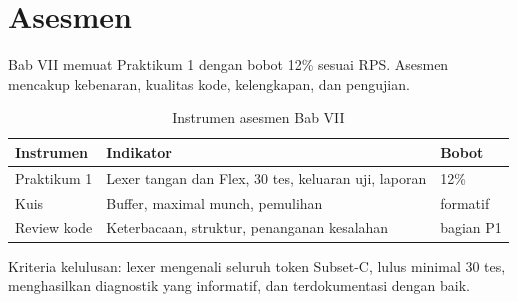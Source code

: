 \section*{Asesmen}

Bab VII memuat Praktikum 1 dengan bobot 12\% sesuai RPS. Asesmen
mencakup kebenaran, kualitas kode, kelengkapan, dan pengujian.

\begin{table}[H]
\centering
\caption{Instrumen asesmen Bab VII}
\label{tab:ch07-asesmen}
\begin{tabularx}{\textwidth}{@{}lXl@{}}
\toprule
\textbf{Instrumen} & \textbf{Indikator} & \textbf{Bobot} \\
\midrule
Praktikum 1 & Lexer tangan dan Flex, 30 tes, keluaran uji, laporan &
12\% \\
Kuis & Buffer, maximal munch, pemulihan & formatif \\
Review kode & Keterbacaan, struktur, penanganan kesalahan & bagian P1 \\
\bottomrule
\end{tabularx}
\end{table}

Kriteria kelulusan: lexer mengenali seluruh token Subset-C, lulus
minimal 30 tes, menghasilkan diagnostik yang informatif, dan
terdokumentasi dengan baik.
